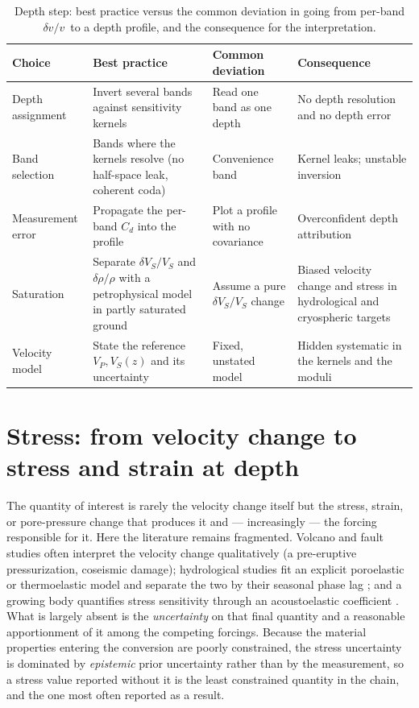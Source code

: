 \documentclass[
  referee]{gji}
\providecommand{\dvv}{\ensuremath{\delta v/v}}
\begin{document}
\begin{table}
\footnotesize
\caption{Depth step: best practice versus the common deviation in going from
per-band \dvv\ to a depth profile, and the consequence for the interpretation.}
\label{tab:bp-depth}
\begin{tabularx}{\textwidth}{@{}>{\raggedright\arraybackslash}p{2.6cm} L L L@{}}
\toprule
\textbf{Choice} & \textbf{Best practice} & \textbf{Common deviation} &
\textbf{Consequence} \\
\midrule
Depth assignment & Invert several bands against sensitivity kernels &
Read one band as one depth & No depth resolution and no depth error \\ \hline
Band selection & Bands where the kernels resolve (no half-space leak, coherent
coda) & Convenience band & Kernel leaks; unstable inversion \\ \hline
Measurement error & Propagate the per-band $C_d$ into the profile & Plot a profile
with no covariance & Overconfident depth attribution \\ \hline
Saturation & Separate $\delta V_S/V_S$ and $\delta\rho/\rho$ with a petrophysical
model in partly saturated ground & Assume a pure $\delta V_S/V_S$ change & Biased
velocity change and stress in hydrological and cryospheric targets \\ \hline
Velocity model & State the reference $V_P,V_S(z)$ and its uncertainty & Fixed,
unstated model & Hidden systematic in the kernels and the moduli \\
\bottomrule
\end{tabularx}
\end{table}

\section{Stress: from velocity change to stress and strain at
depth}\label{sec:stress}

The quantity of interest is rarely the velocity change itself but the
stress, strain, or pore-pressure change that produces it and ---
increasingly --- the forcing responsible for it. Here the literature
remains fragmented. Volcano and fault studies often interpret the
velocity change qualitatively (a pre-eruptive pressurization, coseismic
damage); hydrological studies fit an explicit poroelastic or
thermoelastic model and separate the two by their seasonal phase lag
\citep{Tsai2011, Wang2017, Clements2018}; and a growing body quantifies
stress sensitivity through an acoustoelastic coefficient
\citep{Brenguier2008, Nakata2011}. What is largely absent is the
\emph{uncertainty} on that final quantity and a reasonable apportionment
of it among the competing forcings. Because the material properties
entering the conversion are poorly constrained, the stress uncertainty
is dominated by \emph{epistemic} prior uncertainty rather than by the
measurement, so a stress value reported without it is the least
constrained quantity in the chain, and the one most often reported as a
result.
\end{document}
